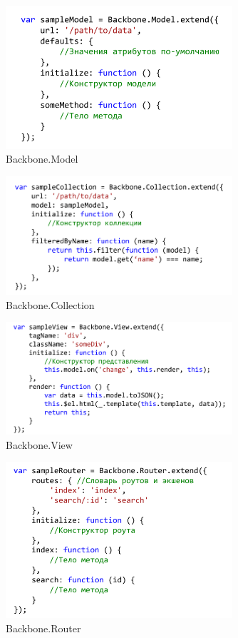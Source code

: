 \begin{figure}[h]
\center\includegraphics[width=0.75\textwidth]{model}
\caption{Backbone.Model}\label{modal}
\end{figure}

\begin{figure}[h]
\center\includegraphics[width=0.75\textwidth]{collection}
\caption{Backbone.Collection}\label{collection}
\end{figure}


\begin{figure}[h]
\center\includegraphics[width=0.75\textwidth]{view}
\caption{Backbone.View}\label{view}
\end{figure}

\begin{figure}[h]
\center\includegraphics[width=0.75\textwidth]{router}
\caption{Backbone.Router}\label{router}
\end{figure}

